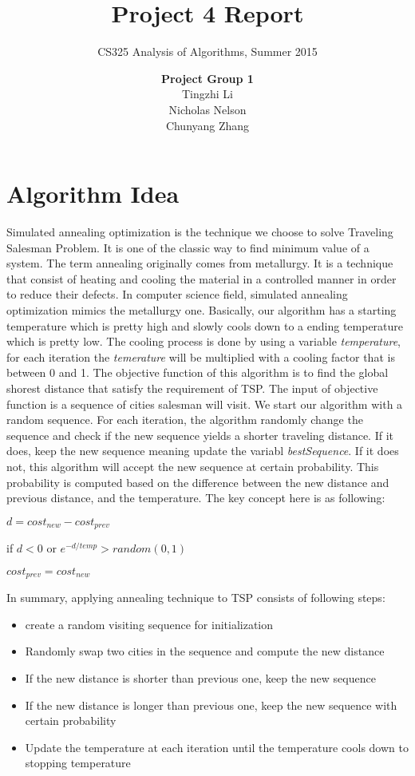 \documentclass[11pt]{scrreprt}
\title{\textbf{Project 4 Report}}
\subtitle{CS325 Analysis of Algorithms, Summer 2015}
\author{\textsf{\textbf{Project Group 1}}\\
		\textsf{Tingzhi Li}\\
		\textsf{Nicholas Nelson}\\
		\textsf{Chunyang Zhang}}
\date{}
\begin{document}
\maketitle

\chapter{Algorithm Idea}

Simulated annealing optimization is the technique we choose to solve Traveling Salesman Problem. It is one of the classic way to find minimum value of a system. The term annealing originally comes from metallurgy. It is a technique that consist of heating and cooling the material in a controlled manner in order to reduce their defects. In computer science field, simulated annealing optimization mimics the metallurgy one. Basically, our algorithm has a starting temperature which is pretty high and slowly cools down to a ending temperature which is pretty low. The cooling process is done by using a variable \emph{temperature}, for each iteration the \emph{temerature} will be multiplied with a cooling factor that is between 0 and 1. The objective function of this algorithm is to find the global shorest distance that satisfy the requirement of TSP. The input of objective function is a sequence of cities salesman will visit. We start our algorithm with a random sequence. For each iteration, the algorithm randomly change the sequence and check if the new sequence yields a shorter traveling distance. If it does, keep the new sequence meaning update the variabl \emph{bestSequence}. If it does not, this algorithm will accept the new sequence at certain probability. This probability is computed based on the difference between the new distance and previous distance, and the temperature.
The key concept here is as following:

$d = cost_{new} - cost_{prev}$  

if $d < 0$ or $e^{-d/temp} > random(0,1)$

\quad $cost_{prev} = cost_{new}$

In summary, applying annealing technique to TSP consists of following steps:

\begin{itemize}
	\item create a random visiting sequence for initialization
	\item Randomly swap two cities in the sequence and compute the new distance
	\item If the new distance is shorter than previous one, keep the new sequence
	\item If the new distance is longer than previous one, keep the new sequence with certain probability
	\item Update the temperature at each iteration until the temperature cools down to stopping temperature
\end{itemize}
\end{document}
